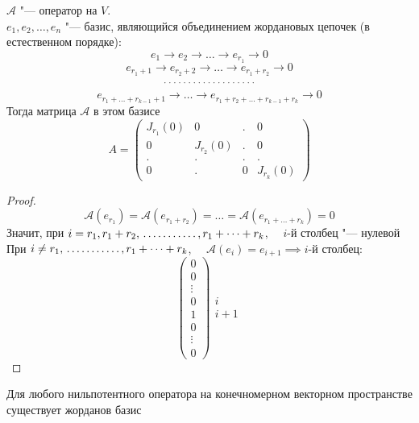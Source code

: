 \begin{lemma}
	$ \mathcal{A} $ "--- оператор на $ V $. \\
    $ e_1, e_2, \dots, e_n $ "--- базис, являющийся объединением жордановых цепочек (в естественном порядке):
	$$ e_1 \to e_2 \to \dots \to e_{r_1} \to 0 $$
	$$ e_{r_1 + 1} \to e_{r_2 + 2} \to \dots \to e_{r_1 + r_2} \to 0 $$
	$$ \widedots $$
	$$ e_{r_1 + \dots + r_{k - 1} + 1} \to \dots \to e_{r_1 + r_2 + \dots + r_{k - 1} + r_k} \to 0 $$
	Тогда матрица $ \mathcal{A} $ в этом базисе
	$$ A =
	\begin{pmatrix}
		J_{r_1}(0) & 0 & . & 0 \\
		0 & J_{r_2}(0) & . & 0 \\
		. & . & . & . \\
		0 & . & 0 & J_{r_k}(0)
	\end{pmatrix} $$
\end{lemma}

\begin{proof}
	$$ \mathcal{A}(e_{r_1}) = \mathcal{A}(e_{r_1 + r_2}) = \dots = \mathcal{A}(e_{r_1 + \dots + r_k}) = 0 $$
	Значит, при $ i = r_1, r_1 + r_2, \widedots[5em], r_1 + \dots + r_k $, $ \quad i $-й столбец "--- нулевой \\
	При $ i \ne r_1, \widedots[5em], r_1 + \dots + r_k $, $ \quad \mathcal{A}(e_i) = e_{i + 1} \implies i $-й столбец:
	$$
	\begin{pmatrix}
		0 \\
		0 \\
		\vdots \\
		0 \\
		1 \\
		0 \\
		\vdots \\
		0
	\end{pmatrix}
	\begin{matrix}
		\ \\
		\ \\
		\ \\
		i \\
		i + 1 \\
		\ \\
		\ \\
		\
	\end{matrix} $$
\end{proof}

\begin{theorem}
	Для любого нильпотентного оператора на конечномерном векторном пространстве существует жорданов базис
\end{theorem}

